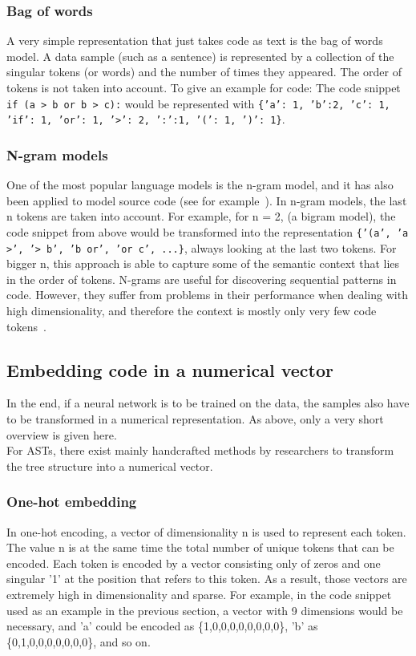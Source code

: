 \documentclass[
a4paper,
pagesize,
pdftex,
12pt,
twoside, %
BCOR=5mm, %
ngerman,
fleqn,
final,
]{scrartcl}
\begin{document}
	\subsubsection{Bag of words}\label{bag-of-words}
	A very simple representation that just takes code as text is the bag of words model. A data sample (such as a sentence) is represented by a collection of the singular tokens (or words) and the number of times they appeared. The order of tokens is not taken into account. To give an example for code: The code snippet \texttt{if (a > b or b > c):} would be represented with \texttt{\{'a': 1, 'b':2, 'c': 1, 'if': 1, 'or': 1, '>': 2, ':':1, '(': 1, ')': 1\}}.
	
	\subsubsection{N-gram models}\label{n-gram}
	One of the most popular language models is the n-gram model, and it has also been applied to model source code (see for example~\cite{Pang.2015}). In n-gram models, the last n tokens are taken into account. For example, for n = 2, (a bigram model), the code snippet from above would be transformed into the representation \texttt{\{'(a', 'a >', '> b', 'b or', 'or c', ...\}}, always looking at the last two tokens. For bigger n, this approach is able to capture some of the semantic context that lies in the order of tokens. N-grams are useful for discovering sequential patterns in code. However, they suffer from problems in their performance when dealing with high dimensionality, and therefore the context is mostly only very few code tokens~\cite{Dam.2016}.
	
	
	\subsection{Embedding code in a numerical vector}
	In the end, if a neural network is to be trained on the data, the samples also have to be transformed in a numerical representation. As above, only a very short overview is given here.\\
	For ASTs, there exist mainly handcrafted methods by researchers to transform the tree structure into a numerical vector.
	
	\subsubsection{One-hot embedding}\label{one-hot}
	In one-hot encoding, a vector of dimensionality n is used to represent each token. The value n is at the same time the total number of unique tokens that can be encoded. Each token is encoded by a vector consisting only of zeros and one singular '1' at the position that refers to this token. As a result, those vectors are extremely high in dimensionality and sparse. For example, in the code snippet used as an example in the previous section, a vector with 9 dimensions would be necessary, and 'a' could be encoded as \{1,0,0,0,0,0,0,0,0\}, 'b' as \{0,1,0,0,0,0,0,0,0\}, and so on.
	
\end{document}
